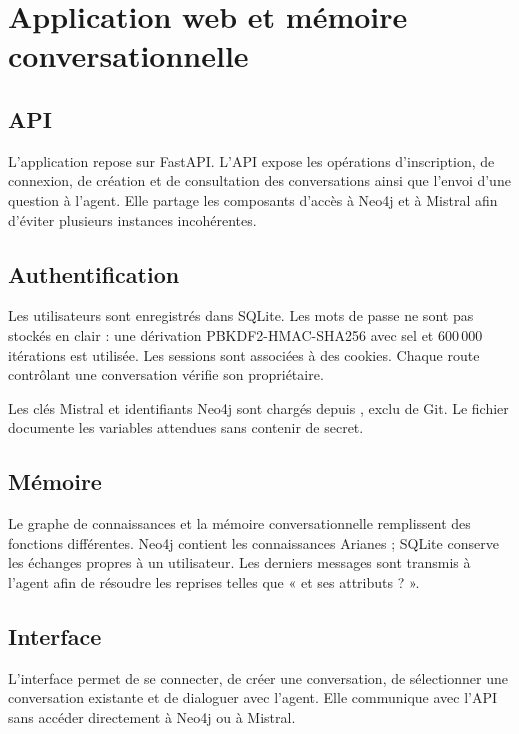 \chapter{Application web et mémoire conversationnelle}

\section{API}

L'application repose sur FastAPI. L'API expose les opérations d'inscription, de connexion, de création et de consultation des conversations ainsi que l'envoi d'une question à l'agent. Elle partage les composants d'accès à Neo4j et à Mistral afin d'éviter plusieurs instances incohérentes.

\section{Authentification}

Les utilisateurs sont enregistrés dans SQLite. Les mots de passe ne sont pas stockés en clair : une dérivation PBKDF2-HMAC-SHA256 avec sel et 600\,000 itérations est utilisée. Les sessions sont associées à des cookies. Chaque route contrôlant une conversation vérifie son propriétaire.

Les clés Mistral et identifiants Neo4j sont chargés depuis , exclu de Git. Le fichier  documente les variables attendues sans contenir de secret.

\section{Mémoire}

Le graphe de connaissances et la mémoire conversationnelle remplissent des fonctions différentes. Neo4j contient les connaissances Arianes ; SQLite conserve les échanges propres à un utilisateur. Les derniers messages sont transmis à l'agent afin de résoudre les reprises telles que « et ses attributs ? ».

\section{Interface}

L'interface permet de se connecter, de créer une conversation, de sélectionner une conversation existante et de dialoguer avec l'agent. Elle communique avec l'API sans accéder directement à Neo4j ou à Mistral.

